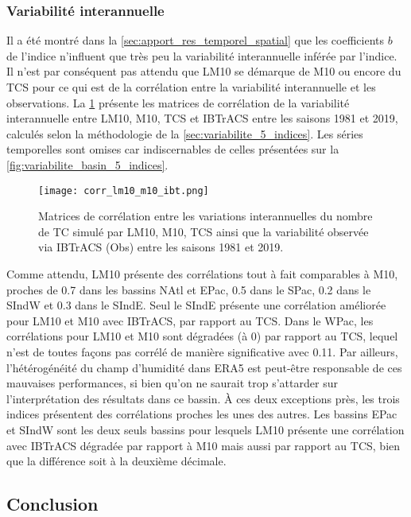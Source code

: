\documentclass[../main.tex]{subfiles}
\begin{document}
\subsubsection{Variabilité interannuelle}\label{sec:lm10_corr}

Il a été montré dans la \cref{sec:apport_res_temporel_spatial} que les coefficients $b$ de l'indice n'influent que très peu la variabilité interannuelle inférée
par l'indice. Il n'est par conséquent pas attendu que LM10 se démarque de M10 ou encore du TCS pour ce qui est de la corrélation entre la variabilité
interannuelle et les observations. La \cref{fig:corr_lm10_m10_ibt} présente les matrices de corrélation de la variabilité interannuelle entre LM10, M10, TCS et
IBTrACS entre les saisons 1981 et 2019, calculés selon la méthodologie de la \cref{sec:variabilite_5_indices}. Les séries temporelles sont omises car
indiscernables de celles présentées sur la \cref{fig:variabilite_basin_5_indices}.

\begin{figure}[htb]
    \centering
    \texttt{[image: corr\_lm10\_m10\_ibt.png]}
    \caption{Matrices de corrélation entre les variations interannuelles du nombre de TC simulé par LM10, M10, TCS ainsi que la variabilité observée via IBTrACS
    (Obs) entre les saisons 1981 et 2019.}
    \label{fig:corr_lm10_m10_ibt}
\end{figure}

Comme attendu, LM10 présente des corrélations tout à fait comparables à M10, proches de \num{0.7} dans les bassins NAtl et EPac, \num{0.5} dans le SPac,
\num{0.2} dans le SIndW et \num{0.3} dans le SIndE. Seul le SIndE présente une corrélation améliorée pour LM10 et M10 avec IBTrACS, par rapport au TCS. Dans le
WPac, les corrélations pour LM10 et M10 sont dégradées (à \num{0}) par rapport au TCS, lequel n'est de toutes façons pas corrélé de manière significative avec
\num{0.11}. Par ailleurs, l'hétérogénéité du champ d'humidité dans ERA5 est peut-être responsable de ces mauvaises performances, si bien qu'on ne saurait trop
s'attarder sur l'interprétation des résultats dans ce bassin. À ces deux exceptions près, les trois indices présentent des corrélations proches les unes des
autres. Les bassins EPac et SIndW sont les deux seuls bassins pour lesquels LM10 présente une corrélation avec IBTrACS dégradée par rapport à M10 mais aussi par
rapport au TCS, bien que la différence soit à la deuxième décimale.

\subsection{Conclusion}
\end{document}
